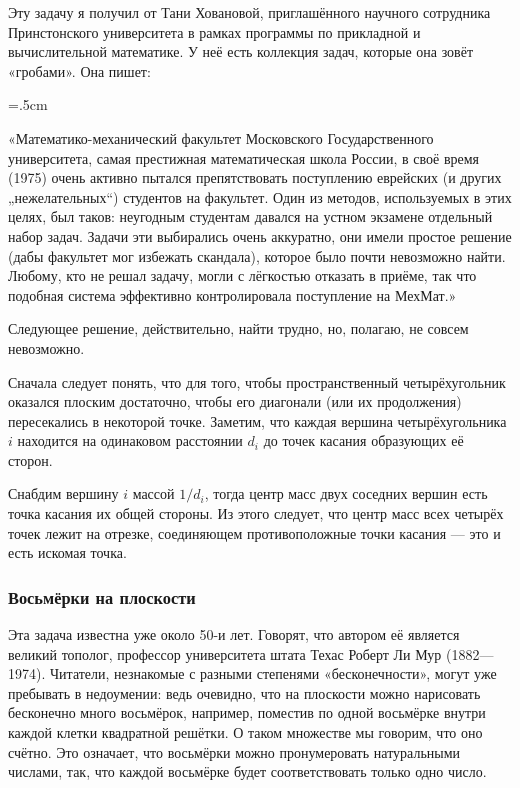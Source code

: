 Эту задачу я получил от Тани Ховановой, приглашённого научного сотрудника Принстонского университета в рамках программы по прикладной и вычислительной математике.
У неё есть коллекция задач, которые она зовёт «гробами».
Она пишет:

\medskip

\begin{trivlist}\leftskip=1cm\rightskip=.5cm
\item\relax«Математико-механический факультет Московского Государственного университета, самая престижная математическая школа России, в своё время (1975) очень активно пытался препятствовать поступлению еврейских (и других „нежелательных“) студентов на факультет.
Один из методов, используемых в этих целях, был таков: неугодным студентам давался на устном экзамене отдельный набор задач.
Задачи эти выбирались очень аккуратно, они имели простое решение (дабы факультет мог избежать скандала), которое было почти невозможно найти.
Любому, кто не решал задачу, могли с лёгкостью отказать в приёме, так что подобная система эффективно контролировала поступление на МехМат.» 
\end{trivlist}

\medskip

Следующее решение, действительно, найти трудно, но, полагаю, не совсем невозможно.

\medskip

Сначала следует понять, что для того, чтобы пространственный четырёхугольник оказался плоским достаточно, чтобы его диагонали (или их продолжения) пересекались в некоторой точке.
Заметим, что каждая вершина четырёхугольника $i$ находится на одинаковом расстоянии $d_i$ до точек касания образующих её сторон.

Снабдим вершину $i$ массой $1/d_i$, тогда центр масс двух соседних вершин есть точка касания их общей стороны.
Из этого следует, что центр масс всех четырёх точек лежит на отрезке, соединяющем противоположные точки касания --- это и есть искомая точка.
\heart

\subsubsection*{Восьмёрки на плоскости}%

Эта задача известна уже около 50-и лет.
Говорят, что автором её является великий тополог, профессор университета штата Техас Роберт Ли Мур (1882---1974). %
Читатели, незнакомые с разными степенями «бесконечности», могут уже пребывать в недоумении: ведь очевидно, что на плоскости можно нарисовать бесконечно много восьмёрок, например, поместив по одной восьмёрке внутри каждой клетки квадратной решётки.
О таком множестве мы говорим, что оно счётно. 
Это означает, что восьмёрки можно пронумеровать натуральными числами, так, что каждой восьмёрке будет соответствовать только одно число.

